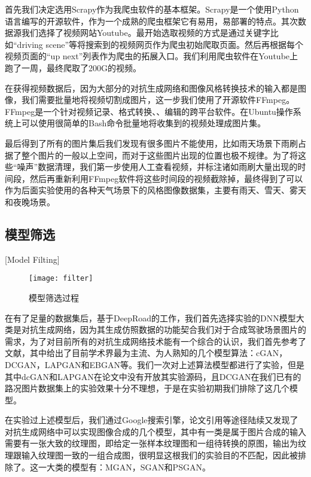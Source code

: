首先我们决定选用Scrapy作为我爬虫软件的基本框架。Scrapy是一个使用Python语言编写的开源软件，作为一个成熟的爬虫框架它有易用，易部署的特点。其次数据源我们选择了视频网站Youtube。最开始选取视频的方式是通过关键字比如“driving scene”等将搜索到的视频网页作为爬虫初始爬取页面。然后再根据每个视频页面的“up next”列表作为爬虫的拓展入口。我们利用爬虫软件在Youtube上跑了一周，最终爬取了200G的视频。

在获得视频数据后，因为大部分的对抗生成网络和图像风格转换技术的输入都是图像，我们需要批量地将视频切割成图片，这一步我们使用了开源软件FFmpeg。FFmpeg是一个针对视频记录、格式转换、、编辑的跨平台软件。在Ubuntu操作系统上可以使用很简单的Bash命令批量地将收集到的视频处理成图片集。

最后得到了所有的图片集后我们发现有很多图片不能使用，比如雨天场景下雨刷占据了整个图片的一般以上空间，而对于这些图片出现的位置也极不规律。为了将这些“噪声”数据清理，我们第一步使用人工查看视频，并标注诸如雨刷大量出现的时间段，然后再重新利用FFmpeg软件将这些时间段的视频截除掉，最终得到了可以作为后面实验使用的各种天气场景下的风格图像数据集，主要有雨天、雪天、雾天和夜晚场景。

\subsection{模型筛选}[Model Filting]

\begin{figure}[t]
    \centering
    \texttt{[image: filter]}
    \caption{模型筛选过程}
    \label{fig:filtering}
\end{figure}

在有了足量的数据集后，基于DeepRoad的工作，我们首先选择实验的DNN模型大类是对抗生成网络\cite{GAN}，因为其生成仿照数据的功能契合我们对于合成驾驶场景图片的需求，为了对目前所有的对抗生成网络技术能有一个综合的认识，我们首先参考了文献\cite{gan-survey}，其中给出了目前学术界最为主流、为人熟知的几个模型算法：cGAN\cite{cGAN}，DCGAN\cite{dcgan}，LAPGAN\cite{LAPGAN}和EBGAN\cite{ebgan}等。我们一次对上述算法模型都进行了实验，但是其中dcGAN和LAPGAN在论文中没有开放其实验源码，且DCGAN在我们已有的路况图片数据集上的实验效果十分不理想，于是在实验初期我们排除了这几个模型。

在实验过上述模型后，我们通过Google搜索引擎，论文引用等途径陆续又发现了对抗生成网络中可以实现图像合成的几个模型，其中有一类是属于图片合成的输入需要有一张大致的纹理图，即给定一张样本纹理图和一组待转换的原图，输出为纹理跟输入纹理图一致的一组合成图，很明显这根我们的实验目的不匹配，因此被排除了。这一大类的模型有：MGAN\cite{MGAN}，SGAN\cite{SGAN}和PSGAN\cite{PSGAN}。

